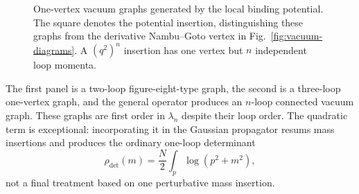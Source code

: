 \begin{figure}[h!]
  \centering
  \begin{minipage}{0.30\linewidth}
    \centering
  \end{minipage}
  \hfill
  \begin{minipage}{0.30\linewidth}
    \centering
  \end{minipage}
  \hfill
  \begin{minipage}{0.30\linewidth}
    \centering
  \end{minipage}
  \caption{One-vertex vacuum graphs generated by the local binding potential.
  The square denotes the potential insertion, distinguishing these graphs from
  the derivative Nambu--Goto vertex in Fig.~\ref{fig:vacuum-diagrams}.  A
  $(q^2)^n$ insertion has one vertex but $n$ independent loop momenta.}
  \label{fig:binding-potential-vacuum-diagrams}
\end{figure}

The first panel is a two-loop figure-eight-type graph, the second is a
three-loop one-vertex graph, and the general operator produces an $n$-loop
connected vacuum graph.  These graphs are first order in $\lambda_n$ despite
their loop order.  The quadratic term is exceptional: incorporating it in the
Gaussian propagator resums mass insertions and produces the ordinary one-loop
determinant
\begin{equation}
  \rho_{\mathrm{det}}(m)=\frac{N}{2}\int_p\log(p^2+m^2),
\end{equation}
not a final treatment based on one perturbative mass insertion.

